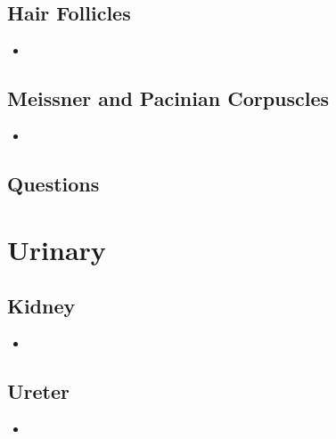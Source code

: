 \subsection{Hair Follicles}
\begin{multicols}{2}
\begin{itemize}
  \item 
\end{itemize}
\end{multicols}

\subsection{Meissner and Pacinian Corpuscles}
\begin{multicols}{2}
\begin{itemize}
  \item 
\end{itemize}
\end{multicols}

\subsection{Questions}
\begin{itemize}
\end{itemize}



\newpage
\section{Urinary}

\subsection{Kidney}
\begin{multicols}{2}
\begin{itemize}
  \item 
\end{itemize}
\end{multicols}

\subsection{Ureter}
\begin{multicols}{2}
\begin{itemize}
  \item 
\end{itemize}
\end{multicols}

